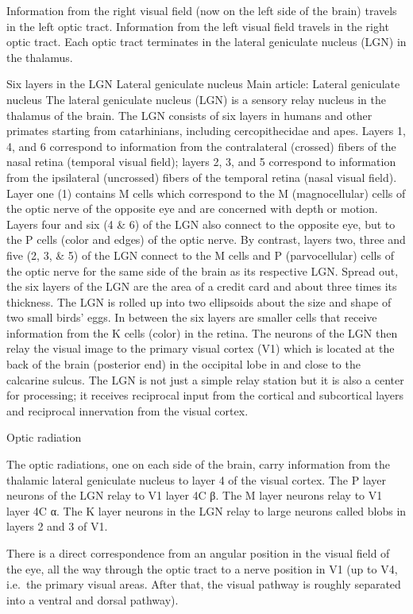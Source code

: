 Information from the right visual field (now on the left side of the brain) travels in the left optic tract. Information from the left visual field travels in the right optic tract. Each optic tract terminates in the lateral geniculate nucleus (LGN) in the thalamus.

Six layers in the LGN
Lateral geniculate nucleus
Main article: Lateral geniculate nucleus
The lateral geniculate nucleus (LGN) is a sensory relay nucleus in the thalamus of the brain. The LGN consists of six layers in humans and other primates starting from catarhinians, including cercopithecidae and apes. Layers 1, 4, and 6 correspond to information from the contralateral (crossed) fibers of the nasal retina (temporal visual field); layers 2, 3, and 5 correspond to information from the ipsilateral (uncrossed) fibers of the temporal retina (nasal visual field). Layer one (1) contains M cells which correspond to the M (magnocellular) cells of the optic nerve of the opposite eye and are concerned with depth or motion. Layers four and six (4 \& 6) of the LGN also connect to the opposite eye, but to the P cells (color and edges) of the optic nerve. By contrast, layers two, three and five (2, 3, \& 5) of the LGN connect to the M cells and P (parvocellular) cells of the optic nerve for the same side of the brain as its respective LGN. Spread out, the six layers of the LGN are the area of a credit card and about three times its thickness. The LGN is rolled up into two ellipsoids about the size and shape of two small birds' eggs. In between the six layers are smaller cells that receive information from the K cells (color) in the retina. The neurons of the LGN then relay the visual image to the primary visual cortex (V1) which is located at the back of the brain (posterior end) in the occipital lobe in and close to the calcarine sulcus. The LGN is not just a simple relay station but it is also a center for processing; it receives reciprocal input from the cortical and subcortical layers and reciprocal innervation from the visual cortex.

Optic radiation

The optic radiations, one on each side of the brain, carry information from the thalamic lateral geniculate nucleus to layer 4 of the visual cortex. The P layer neurons of the LGN relay to V1 layer 4C β. The M layer neurons relay to V1 layer 4C α. The K layer neurons in the LGN relay to large neurons called blobs in layers 2 and 3 of V1.

There is a direct correspondence from an angular position in the visual field of the eye, all the way through the optic tract to a nerve position in V1 (up to V4, i.e.~the primary visual areas. After that, the visual pathway is roughly separated into a ventral and dorsal pathway).


